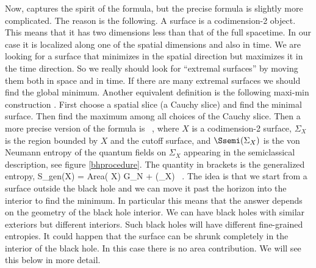  Now,   captures the spirit of the formula, but the precise formula is slightly more complicated. The reason is the following. A surface is a codimension-2 object. This means that it has two dimensions less than that of the full spacetime. In our case it is localized along one of the spatial dimensions and also in time. We are looking for a surface that     minimizes  in the spatial direction but maximizes it in the time direction.  So we really should look for ``extremal surfaces'' by moving them both in space and in time. If there are many extremal surfaces we should find the global minimum. Another equivalent definition is the  following maxi-min construction  \cite{Wall:2012uf,Akers:2019lzs}.   First choose a spatial slice (a Cauchy slice) and find the minimal surface. Then find the maximum among all choices of the Cauchy slice.  Then a more precise version of the formula is 
 \cite{Ryu:2006bv,Hubeny:2007xt,Faulkner:2013ana,Engelhardt:2014gca} 
 \be {} 
\setlength\fboxsep{0.25cm}
\setlength\fboxrule{0.4pt}
  \ ,
 \ee 
 where $X$ is a codimension-2 surface, $\Sigma_X$ is the region bounded by $X$ and the cutoff surface, and $\Ssemi(\Sigma_X)$ is the von Neumann entropy of the quantum fields on $\Sigma_X$ appearing in the semiclassical description, see figure \ref{bhprocedure}. The quantity in brackets is the generalized entropy,
 \be{}
 S_{\rm gen}(X) = { {\rm Area}( X)   G_N} + \Ssemi(\Sigma_X) \ .
 \ee
 The idea is that we start from a surface outside the black hole and we can move it past the horizon into the interior to find the minimum. In particular this means that the answer depends on the geometry of the black hole interior. We can have black holes with similar exteriors but different interiors.  Such black holes will have different fine-grained entropies.
	It could happen that the surface can be shrunk completely in the interior of the black hole. In this case there is no area contribution. We will see this below in more detail. 
	
